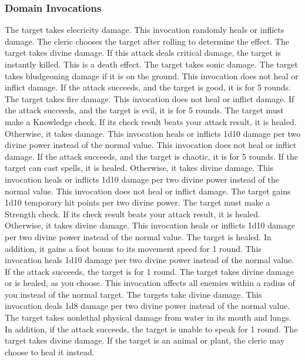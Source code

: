 \subsubsection{Domain Invocations}\label{Domain Invocations}

The target takes elecricity damage.
This invocation randomly heals or inflicts damage.
The cleric chooses the target after rolling to determine the effect.
The target takes divine damage.
If this attack deals critical damage, the target is instantly killed.
This is a death effect.
The target takes sonic damage.
The target takes bludgeoning damage if it is on the ground.
This invocation does not heal or inflict damage.
If the attack succeeds, and the target is good, it is \staggered for 5 rounds.
The target takes fire damage.
This invocation does not heal or inflict damage.
If the attack succeeds, and the target is evil, it is \dazed for 5 rounds.
The target must make a Knowledge check.
If its check result beats your attack result, it is healed.
Otherwise, it takes damage.
This invocation heals or inflicts 1d10 damage per two divine power instead of the normal value.
This invocation does not heal or inflict damage.
If the attack succeeds, and the target is chaotic, it is \immobilized for 5 rounds.
If the target can cast spells, it is healed.
Otherwise, it takes divine damage.
This invocation heals or inflicts 1d10 damage per two divine power instead of the normal value.
This invocation does not heal or inflict damage.
The target gains 1d10 temporary hit points per two divine power.
The target must make a Strength check.
If its check result beats your attack result, it is healed.
Otherwise, it takes divine damage.
This invocation heals or inflicts 1d10 damage per two divine power instead of the normal value.
The target is healed.
In addition, it gains a  foot bonus to its movement speed for 1 round.
This invocation heals 1d10 damage per two divine power instead of the normal value.
If the attack succeeds, the target is \disoriented for 1 round.
The target takes divine damage or is healed, as you choose.
This invocation affects all enemies within a \areasmall radius of you instead of the normal target.
The targets take divine damage.
This invocation deals 1d8 damage per two divine power instead of the normal value.
The target takes nonlethal physical damage from water in its mouth and lungs.
In addition, if the attack succeeds, the target is unable to speak for 1 round.
The target takes divine damage.
If the target is an animal or plant, the cleric may choose to heal it instead.

